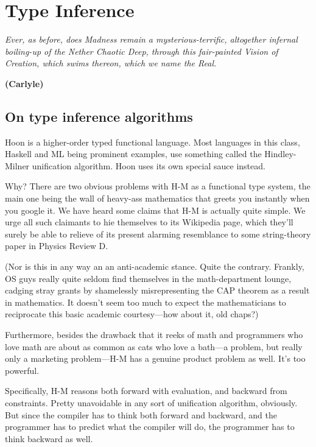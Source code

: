 \chapter{Type Inference}

\emph{Ever, as before, does Madness remain a mysterious-terrific, altogether infernal boiling-up of the Nether Chaotic Deep, through this fair-painted Vision of Creation, which swims thereon, which we name the Real.}

\textbf{(Carlyle)}

\section{On type inference algorithms}

Hoon is a higher-order typed functional language.  Most languages
in this class, Haskell and ML being prominent examples, use
something called the Hindley-Milner unification algorithm.  Hoon
uses its own special sauce instead.

Why?  There are two obvious problems with H-M as a functional
type system, the main one being the wall of heavy-ass mathematics
that greets you instantly when you google it.  We have heard some
claims that H-M is actually quite simple.  We urge all such
claimants to hie themselves to its Wikipedia page, which they'll
surely be able to relieve of its present alarming resemblance to
some string-theory paper in Physics Review D.

(Nor is this in any way an an anti-academic stance.  Quite the
contrary.  Frankly, OS guys really quite seldom find themselves
in the math-department lounge, cadging stray grants by
shamelessly misrepresenting the CAP theorem as a result in
mathematics.  It doesn't seem too much to expect the
mathematicians to reciprocate this basic academic courtesy---how
about it, old chaps?)

Furthermore, besides the drawback that it reeks of math and
programmers who love math are about as common as cats who love a
bath---a problem, but really only a marketing problem---H-M has a
genuine product problem as well.  It's too powerful.  

Specifically, H-M reasons both forward with evaluation, and
backward from constraints.  Pretty unavoidable in any sort of
unification algorithm, obviously.  But since the compiler has to
think both forward and backward, and the programmer has to
predict what the compiler will do, the programmer has to think
backward as well.

